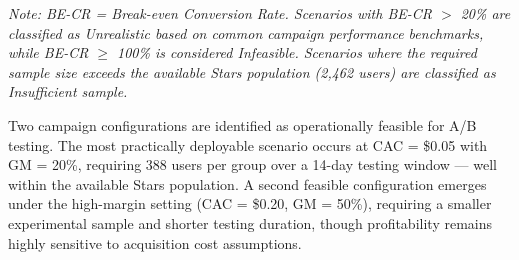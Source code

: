 \documentclass[conference]{IEEEtran}
\begin{document}
\noindent\textit{Note: BE-CR = Break-even Conversion Rate.
Scenarios with BE-CR $>$ 20\% are classified as Unrealistic
based on common campaign performance benchmarks, while
BE-CR $\geq$ 100\% is considered Infeasible. Scenarios
where the required sample size exceeds the available Stars
population (2,462 users) are classified as Insufficient
sample.}

\vspace{0.5em}

Two campaign configurations are identified as operationally
feasible for A/B testing. The most practically deployable
scenario occurs at CAC = \$0.05 with GM = 20\%, requiring
388 users per group over a 14-day testing window --- well
within the available Stars population. A second feasible
configuration emerges under the high-margin setting
(CAC = \$0.20, GM = 50\%), requiring a smaller experimental
sample and shorter testing duration, though profitability
remains highly sensitive to acquisition cost assumptions.
\end{document}
